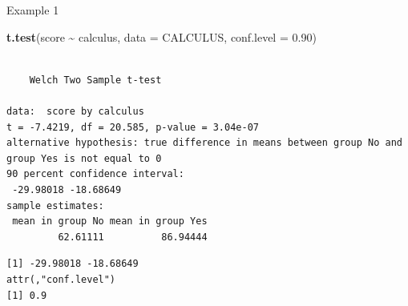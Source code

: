 \documentclass[
  ignorenonframetext,
]{beamer}
\newenvironment{Shaded}{\begin{snugshade}}{\end{snugshade}}
\newcommand{\AttributeTok}[1]{\textcolor[rgb]{0.13,0.29,0.53}{#1}}
\newcommand{\FloatTok}[1]{\textcolor[rgb]{0.00,0.00,0.81}{#1}}
\newcommand{\FunctionTok}[1]{\textcolor[rgb]{0.13,0.29,0.53}{\textbf{#1}}}
\newcommand{\NormalTok}[1]{#1}
\newcommand{\OtherTok}[1]{\textcolor[rgb]{0.56,0.35,0.01}{#1}}
\newcommand{\SpecialCharTok}[1]{\textcolor[rgb]{0.81,0.36,0.00}{\textbf{#1}}}
\begin{document}
\begin{frame}[fragile]{Example 1}
\protect\hypertarget{example-1-3}{}
\tiny

\begin{Shaded}
\begin{Highlighting}[]
\FunctionTok{t.test}\NormalTok{(score }\SpecialCharTok{\textasciitilde{}}\NormalTok{ calculus, }\AttributeTok{data =}\NormalTok{ CALCULUS, }\AttributeTok{conf.level =} \FloatTok{0.90}\NormalTok{)}
\end{Highlighting}
\end{Shaded}

\begin{verbatim}

    Welch Two Sample t-test

data:  score by calculus
t = -7.4219, df = 20.585, p-value = 3.04e-07
alternative hypothesis: true difference in means between group No and group Yes is not equal to 0
90 percent confidence interval:
 -29.98018 -18.68649
sample estimates:
 mean in group No mean in group Yes 
         62.61111          86.94444 
\end{verbatim}

\begin{Shaded}
\end{Shaded}

\begin{verbatim}
[1] -29.98018 -18.68649
attr(,"conf.level")
[1] 0.9
\end{verbatim}

\normalsize
\end{frame}
\end{document}

